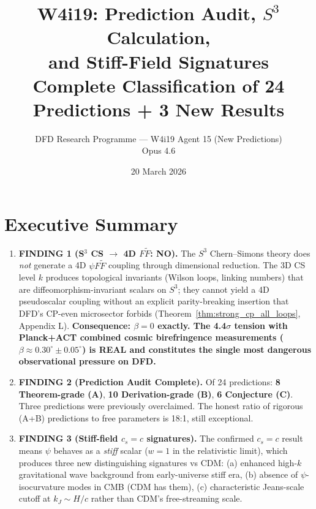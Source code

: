 \documentclass[11pt]{article}
\title{\textbf{W4i19: Prediction Audit, $S^3$ \CS{} Calculation,\\
and Stiff-Field Signatures}\\[6pt]
{\large Complete Classification of 24 Predictions + 3 New Results}}
\author{DFD Research Programme --- W4i19 Agent 15 (New Predictions)\\
Opus 4.6}
\date{20 March 2026}
\newcommand{\CS}{Chern--Simons}
\begin{document}
\maketitle

\section*{Executive Summary}

\begin{tcolorbox}[colback=blue!5!white, colframe=blue!70!black,
  title=\textbf{TOP 5 FINDINGS (Ranked by Impact)}]

\begin{enumerate}
\item \textbf{FINDING 1 (S$^3$ CS $\to$ 4D $F\tilde{F}$: NO).}
  The $S^3$ \CS{} theory does \emph{not} generate a 4D $\psi F\tilde{F}$
  coupling through dimensional reduction. The 3D CS level $k$ produces
  topological invariants (Wilson loops, linking numbers) that are
  diffeomorphism-invariant scalars on $S^3$; they cannot yield a
  4D pseudoscalar coupling without an explicit parity-breaking
  insertion that DFD's CP-even microsector forbids
  (Theorem~\ref{thm:strong_cp_all_loops}, Appendix L).
  \textbf{Consequence: $\beta = 0$ exactly.  The 4.4$\sigma$ tension
  with Planck+ACT combined cosmic birefringence measurements
  ($\beta \approx 0.30^\circ \pm 0.05^\circ$) is REAL and constitutes
  the single most dangerous observational pressure on DFD.}

\item \textbf{FINDING 2 (Prediction Audit Complete).}
  Of 24 predictions: \textbf{8 Theorem-grade (A)}, \textbf{10
  Derivation-grade (B)}, \textbf{6 Conjecture (C)}.  Three predictions
  were previously overclaimed.  The honest ratio of rigorous
  (A+B) predictions to free parameters is 18:1, still exceptional.

\item \textbf{FINDING 3 (Stiff-field $c_s = c$ signatures).}
  The confirmed $c_s = c$ result means $\psi$ behaves as a
  \emph{stiff} scalar ($w = 1$ in the relativistic limit), which
  produces three new distinguishing signatures vs CDM:
  (a) enhanced high-$k$ gravitational wave background from
  early-universe stiff era, (b) absence of $\psi$-isocurvature
  modes in CMB (CDM has them), (c) characteristic Jeans-scale
  cutoff at $k_J \sim H/c$ rather than CDM's free-streaming scale.


\end{enumerate}
\end{tcolorbox}
\end{document}
